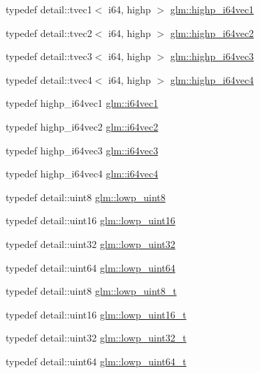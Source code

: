 \begin{CompactItemize}
\item 
typedef detail::tvec1$<$ i64, highp $>$ \hyperlink{group__gtc__type__precision_g06c21aba992669f5c160ec5f5a480522}{glm::highp\_\-i64vec1}
\item 
typedef detail::tvec2$<$ i64, highp $>$ \hyperlink{group__gtc__type__precision_gbfe3aa6fa4003a47577beb9678ab2661}{glm::highp\_\-i64vec2}
\item 
typedef detail::tvec3$<$ i64, highp $>$ \hyperlink{group__gtc__type__precision_g4030f8ad15da56f5e427aa457d39e888}{glm::highp\_\-i64vec3}
\item 
typedef detail::tvec4$<$ i64, highp $>$ \hyperlink{group__gtc__type__precision_g0ea279cd954fbb71a1db62e897d4d7f5}{glm::highp\_\-i64vec4}
\item 
typedef highp\_\-i64vec1 \hyperlink{group__gtc__type__precision_g8bc234da7e4a6436e01241f439fc7ddd}{glm::i64vec1}
\item 
typedef highp\_\-i64vec2 \hyperlink{group__gtc__type__precision_g75461c98baf3e3913566550bd9d8d17f}{glm::i64vec2}
\item 
typedef highp\_\-i64vec3 \hyperlink{group__gtc__type__precision_gb6eefcd7eb24e4142ed23dc1e87163a6}{glm::i64vec3}
\item 
typedef highp\_\-i64vec4 \hyperlink{group__gtc__type__precision_g19846034cab6ee6e031884ea30def7fc}{glm::i64vec4}
\item 
typedef detail::uint8 \hyperlink{group__gtc__type__precision_g4d9dc08b7b248a386dfe9afd00fc6b1e}{glm::lowp\_\-uint8}
\item 
typedef detail::uint16 \hyperlink{group__gtc__type__precision_g9b8409887319f62f06e664f6ca121b9d}{glm::lowp\_\-uint16}
\item 
typedef detail::uint32 \hyperlink{group__gtc__type__precision_gf11e85af414720b4cd12bd57b3a81e68}{glm::lowp\_\-uint32}
\item 
typedef detail::uint64 \hyperlink{group__gtc__type__precision_gcf666a9d9b309c4615c7a4f2ab0be289}{glm::lowp\_\-uint64}
\item 
typedef detail::uint8 \hyperlink{group__gtc__type__precision_g0910ef24195d1b8b26e34d73148c0c45}{glm::lowp\_\-uint8\_\-t}
\item 
typedef detail::uint16 \hyperlink{group__gtc__type__precision_g9a71176a4e5bc61951f9e9197d9c80e1}{glm::lowp\_\-uint16\_\-t}
\item 
typedef detail::uint32 \hyperlink{group__gtc__type__precision_g9f8cb602a358e1f48bda2682cf051f0c}{glm::lowp\_\-uint32\_\-t}
\item 
typedef detail::uint64 \hyperlink{group__gtc__type__precision_gbf3069d4f188557a87b1d7f35eb0a270}{glm::lowp\_\-uint64\_\-t}

\end{CompactItemize}
